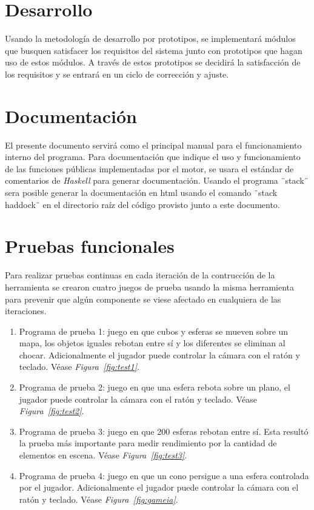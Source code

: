\section{Desarrollo}

Usando la metodología de desarrollo por prototipos, se implementará módulos que busquen satisfacer los requisitos del sistema junto con prototipos que hagan uso de estos módulos. A través de estos prototipos se decidirá la satisfacción de los requisitos y se entrará en un ciclo de corrección y ajuste.

\section{Documentación}

El presente documento servirá como el principal manual para el funcionamiento interno del programa. Para documentación que indique el uso y funcionamiento de las funciones públicas implementadas por el motor, se usara el estándar de comentarios de \emph{Haskell} para generar documentación. Usando el programa ¨stack¨ sera posible generar la documentación en html usando el comando ¨stack haddock¨ en el directorio raíz del código provisto junto a este documento.

\section{Pruebas funcionales}

Para realizar pruebas continuas en cada iteración de la contrucción de la herramienta se crearon cuatro juegos de prueba usando la misma herramienta para prevenir que algún componente se viese afectado en cualquiera de las iteraciones.

\begin{enumerate}
  \item Programa de prueba 1: juego en que cubos y esferas se mueven sobre un mapa, los objetos iguales rebotan entre sí y los diferentes se eliminan al chocar. Adicionalmente el jugador puede controlar la cámara con el ratón y teclado. Véase \emph{Figura~\ref{fig:test1}}.
  \item Programa de prueba 2: juego en que una esfera rebota sobre un plano, el jugador puede controlar la cámara con el ratón y teclado. Véase \emph{Figura~\ref{fig:test2}}.
  \item Programa de prueba 3: juego en que 200 esferas rebotan entre sí. Esta resultó la prueba más importante para medir rendimiento por la cantidad de elementos en escena. Véase \emph{Figura~\ref{fig:test3}}.
  \item Programa de prueba 4: juego en que un cono persigue a una esfera controlada por el jugador. Adicionalmente el jugador puede controlar la cámara con el ratón y teclado. Véase \emph{Figura~\ref{fig:gameia}}.
\end{enumerate}

